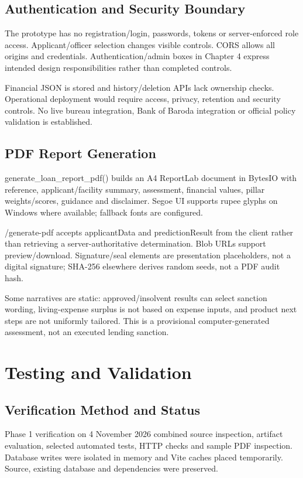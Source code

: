 \documentclass[12pt,a4paper]{report}
\begin{document}
\section{Authentication and Security Boundary}
The prototype has no registration/login, passwords, tokens or server-enforced role access. Applicant/officer selection changes visible controls. CORS allows all origins and credentials. Authentication/admin boxes in Chapter 4 express intended design responsibilities rather than completed controls.

Financial JSON is stored and history/deletion APIs lack ownership checks. Operational deployment would require access, privacy, retention and security controls. No live bureau integration, Bank of Baroda integration or official policy validation is established.

\section{PDF Report Generation}
generate\_loan\_report\_pdf() builds an A4 ReportLab document in BytesIO with reference, applicant/facility summary, assessment, financial values, pillar weights/scores, guidance and disclaimer. Segoe UI supports rupee glyphs on Windows where available; fallback fonts are configured.

/generate-pdf accepts applicantData and predictionResult from the client rather than retrieving a server-authoritative determination. Blob URLs support preview/download. Signature/seal elements are presentation placeholders, not a digital signature; SHA-256 elsewhere derives random seeds, not a PDF audit hash.

Some narratives are static: approved/insolvent results can select sanction wording, living-expense surplus is not based on expense inputs, and product next steps are not uniformly tailored. This is a provisional computer-generated assessment, not an executed lending sanction.

\chapter{Testing and Validation}
\section{Verification Method and Status}
Phase 1 verification on 4 November 2026 combined source inspection, artifact evaluation, selected automated tests, HTTP checks and sample PDF inspection. Database writes were isolated in memory and Vite caches placed temporarily. Source, existing database and dependencies were preserved.
\end{document}
